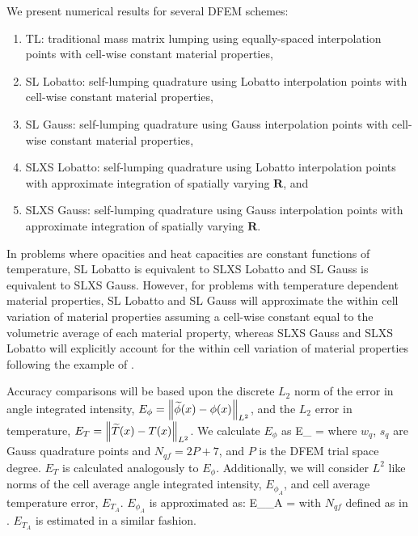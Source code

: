 We present numerical results for several DFEM schemes:
\begin{enumerate}
\item TL: traditional mass matrix lumping using equally-spaced interpolation points with cell-wise constant material properties,
\item SL Lobatto: self-lumping quadrature using Lobatto interpolation points with cell-wise constant material properties,
\item SL Gauss: self-lumping quadrature using Gauss interpolation points with cell-wise constant material properties, 
\item SLXS Lobatto: self-lumping quadrature using Lobatto interpolation points with approximate integration of spatially varying $\mathbf{R}$, and
\item SLXS Gauss: self-lumping quadrature using Gauss interpolation points with approximate integration of spatially varying $\mathbf{R}$.
\end{enumerate}  
In problems where opacities and heat capacities are constant functions of temperature, SL Lobatto is equivalent to SLXS Lobatto and SL Gauss is equivalent to SLXS Gauss.
However, for problems with temperature dependent material properties, SL Lobatto and SL Gauss will approximate the within cell variation of material properties assuming a cell-wise constant equal to the volumetric average of each material property, whereas SLXS Gauss and SLXS Lobatto will explicitly account for the within cell variation of material properties following the example of .

Accuracy comparisons will be based upon the discrete $L_2$ norm of the error in angle integrated intensity, $E_{\phi} = \left\lVert  \widetilde{\phi}(x) - \phi(x) \right\rVert_{L^2}$, and the $L_2$ error in temperature, $E_T = \left\lVert  \widetilde{T}(x) - T(x)  \right\rVert_{L^2}$.
We calculate $E_{\phi}$ as
\benum
E_{\phi} = \pec
\label{eq:e_phi_6}
\eenum
where $w_q$, $s_q$ are Gauss quadrature points and $N_{qf} = 2P+7$, and $P$ is the DFEM trial space degree.  
$E_{T}$ is calculated analogously to $E_{\phi}$.
Additionally, we will consider $L^2$ like norms of the cell average angle integrated intensity, $E_{\phi_A}$, and cell average temperature error, $E_{T_A}$.
$E_{\phi_A}$ is approximated as:
\benum
E_{\phi_A} =  \pec
\eenum
with $N_{qf}$ defined as in .  $E_{T_A}$ is estimated in a similar fashion.

